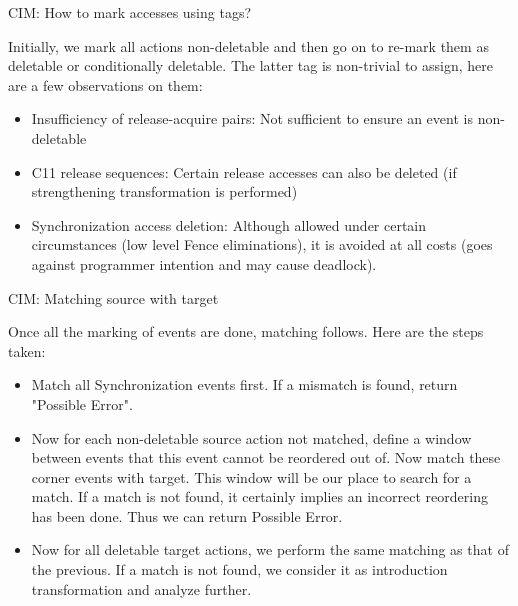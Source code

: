 \documentclass[xcolor=dvipsnames, notes]{beamer}
\begin{document}
    \begin{frame}{CIM: How to mark accesses using tags? }

        Initially, we mark all actions non-deletable and then go on to re-mark them as deletable or conditionally deletable.
        The latter tag is non-trivial to assign, here are a few observations on them:
        \begin{itemize}
            \item Insufficiency of release-acquire pairs: Not sufficient to ensure an event is non-deletable
            \item C11 release sequences: Certain release accesses can also be deleted (if strengthening transformation is performed)
            \item Synchronization access deletion: Although allowed under certain circumstances (low level Fence eliminations), it is avoided at all costs (goes against programmer intention and may cause deadlock).  
        \end{itemize}

    \end{frame}


    \begin{frame}{CIM: Matching source with target}

        Once all the marking of events are done, matching follows. Here are the steps taken:
        \begin{itemize}
            \item Match all Synchronization events first. If a mismatch is found, return "Possible Error".
            \item Now for each non-deletable source action not matched, define a window between events that this event cannot be reordered out of. Now match these corner events with target. This window will be our place to search for a match. If a match is not found, it certainly implies an incorrect reordering has been done. Thus we can return Possible Error.
            \item Now for all deletable target actions, we perform the same matching as that of the previous. If a match is not found, we consider it as introduction transformation and analyze further.  
        \end{itemize}

    \end{frame}
\end{document}
